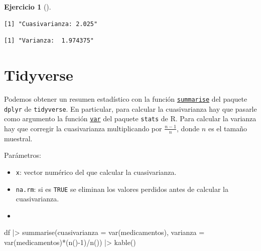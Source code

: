 \documentclass[
  a4paper,
]{scrreport}
\newenvironment{Shaded}{\begin{snugshade}}{\end{snugshade}}
\newcommand{\AttributeTok}[1]{\textcolor[rgb]{0.40,0.45,0.13}{#1}}
\newcommand{\CommentTok}[1]{\textcolor[rgb]{0.37,0.37,0.37}{#1}}
\newcommand{\DecValTok}[1]{\textcolor[rgb]{0.68,0.00,0.00}{#1}}
\newcommand{\FunctionTok}[1]{\textcolor[rgb]{0.28,0.35,0.67}{#1}}
\newcommand{\NormalTok}[1]{\textcolor[rgb]{0.00,0.23,0.31}{#1}}
\newcommand{\SpecialCharTok}[1]{\textcolor[rgb]{0.37,0.37,0.37}{#1}}
\newcommand{\StringTok}[1]{\textcolor[rgb]{0.13,0.47,0.30}{#1}}
\providecommand{\tightlist}{%
  \setlength{\itemsep}{0pt}\setlength{\parskip}{0pt}}\usepackage{longtable,booktabs,array}
\theoremstyle{definition}
\newtheorem{exercise}{Ejercicio}[chapter]
\theoremstyle{remark}
\begin{document}
\begin{exercise}[]
\begin{enumerate}
\begin{tcolorbox}
\begin{verbatim}
[1] "Cuasivarianza: 2.025"
\end{verbatim}

\begin{Shaded}
\end{Shaded}

\begin{verbatim}
[1] "Varianza:  1.974375"
\end{verbatim}

  \section{Tidyverse}

  Podemos obtener un resumen estadístico con la función
  \href{https://dplyr.tidyverse.org/reference/summarise.html}{\texttt{summarise}}
  del paquete \texttt{dplyr} de \texttt{tidyverse}. En particular, para
  calcular la cuasivarianza hay que pasarle como argumento la función
  \href{https://www.rdocumentation.org/packages/stats/versions/3.6.2/topics/cor}{\texttt{var}}
  del paquete \texttt{stats} de R. Para calcular la varianza hay que
  corregir la cuasivarianza multiplicando por \(\frac{n-1}{n}\), donde
  \(n\) es el tamaño muestral.

  Parámetros:

  \begin{itemize}
  \tightlist
  \item
    \texttt{x}: vector numérico del que calcular la cuasivarianza.
  \item
    \texttt{na.rm}: si es \texttt{TRUE} se eliminan los valores perdidos
    antes de calcular la cuasivarianza.
  \item
  \end{itemize}

\begin{Shaded}
\begin{Highlighting}[]
\NormalTok{df }\SpecialCharTok{|\textgreater{}} \FunctionTok{summarise}\NormalTok{(}\AttributeTok{cuasivarianza =} \FunctionTok{var}\NormalTok{(medicamentos), }
    \AttributeTok{varianza =} \FunctionTok{var}\NormalTok{(medicamentos)}\SpecialCharTok{*}\NormalTok{(}\FunctionTok{n}\NormalTok{()}\SpecialCharTok{{-}}\DecValTok{1}\NormalTok{)}\SpecialCharTok{/}\FunctionTok{n}\NormalTok{()) }\SpecialCharTok{|\textgreater{}} 
    \FunctionTok{kable}\NormalTok{()}
\end{Highlighting}
\end{Shaded}


\end{tcolorbox}
\end{enumerate}
\end{exercise}
\end{document}
